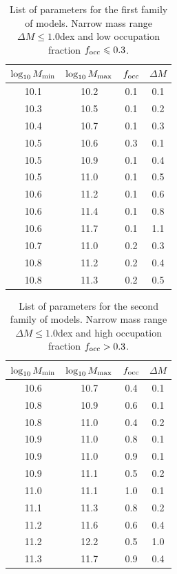 \documentclass[usenatbib]{mn2e}
\begin{document}
\begin{table}
\begin{center}
\begin{tabular}{cccc}\hline\hline
$\log_{10}M_{\rm min}$ & $\log_{10}M_{\rm max}$ & $f_{\rm occ}$ & $\Delta M$\\\hline
10.1 &10.2 & 0.1 & 0.1\\
10.3 &10.5 & 0.1 & 0.2\\
10.4 &10.7 & 0.1 & 0.3\\
10.5 &10.6 & 0.3 & 0.1\\
10.5 &10.9 & 0.1 & 0.4\\
10.5 &11.0 & 0.1 & 0.5\\
10.6 &11.2 & 0.1 & 0.6\\
10.6 &11.4 & 0.1 & 0.8\\
10.6 &11.7 & 0.1 & 1.1\\
10.7 &11.0 & 0.2 & 0.3\\
10.8 &11.2 & 0.2 & 0.4\\
10.8 &11.3 & 0.2 & 0.5\\\hline
\end{tabular}
\end{center}
\caption{\label{table:firstfamily}List of parameters for the first
  family of models. Narrow mass range $\Delta M\leq 1.0$dex and low
  occupation fraction $f_{\rm occ}\leq 0.3$.} 
\end{table}



\begin{table}
\begin{center}
\begin{tabular}{cccc}\hline\hline
$\log_{10}M_{\rm min}$ & $\log_{10}M_{\rm max}$ & $f_{\rm occ}$ & $\Delta M$\\\hline
10.6 &10.7 &0.4 & 0.1\\
10.8 &10.9 &0.6 & 0.1\\
10.8 &11.0 &0.4 & 0.2\\
10.9 &11.0 &0.8 & 0.1\\
10.9 &11.0 &0.9 & 0.1\\
10.9 &11.1 &0.5 & 0.2\\
11.0 &11.1 &1.0 & 0.1\\
11.1 &11.3 &0.8 & 0.2\\
11.2 &11.6 &0.6 & 0.4\\
11.2 &12.2 &0.5 & 1.0\\
11.3 &11.7 &0.9 & 0.4\\\hline
\end{tabular}
\end{center}
\caption{\label{table:secondfamily}List of parameters for the second
  family of models. Narrow mass range $\Delta M\leq 1.0$dex and high occupation fraction $f_{\rm occ}>0.3$.}
\end{table}
\end{document}
